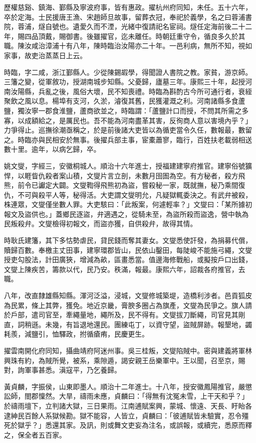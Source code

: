 \begin{pinyinscope}
歷權慈谿、鎮海、鄞縣及寧波府事，皆有惠政。擢杭州府同知，未任。五十六年，卒於定海。士民援唐王漁、宋趙師旦故事，留葬衣冠，奉祀於義學，名之曰蓉浦書院，蓉浦，燧自號也。遺愛久而不湮，光緒中復請祀名宦祠。燧任定海前後二十二年，賜四品頂戴，賜御書。後雖擢官，迄未離任。時朝廷重守令，循良多久於其職。陳汝咸治漳浦十有八年，陳時臨治汝陽亦二十年。一邑利病，無所不知，視如家事，故吏治蒸蒸日上云。

時臨，字二咸，浙江鄞縣人。少從陳錫嘏學，得聞證人書院之教。家貧，游京師。三籓之變，從軍敘功，授湖南城步知縣。父憂歸，廬墓三年。康熙三十年，起授河南汝陽縣，兵亂之後，風俗大壞，民不知喪禮。時臨為斟酌古今所可通行者，衰絰聚飲之風以息。楊埠有支河，久淤，濬復其舊，民獲灌溉之利。河南諸縣多食蘆鹽，獨汝寧一郡食淮鹽，蘆商欲並之，時臨謂：「蘆鹽計口而授，不問其所需之多寡，以成額給之，是厲民也。吾不能為河南盡革其害，反徇商人意以害境內乎？」力爭得止。巡撫徐潮亟稱之，於是前後諸大吏皆以為循吏當令久任，數報最，數留之。時臨亦與民相安於無事。後擢兵部主事，宦橐蕭寥，臨行，百姓扶老載弱相送數十里。逾年，以病乞歸，卒。

姚文燮，字經三，安徽桐城人。順治十六年進士，授福建建寧府推官。建寧俗號獷悍，以睚眥仇殺者案山積，文燮片言立剖，未數月囹圄為空。有方秘者，殺方飛熊，前令已讞定大闢。文燮鞫得飛熊初為盜，嘗殺秘一家，既就撫，秘乃乘間復仇，不可與殺平人等，秘得活。大吏謂文燮明允，凡疑獄輒委決之。有武弁被殺，株連眾，文燮僅坐數人罪。大吏駭曰：「此叛案，何遽輕率？」文燮曰：「某所據初報文及盜供也。」蓋鄉民逐盜，弁適遇之，從騎未至，為盜所殺而盜逸，營中執為民叛殺弁。文燮檢得初報文，而盜亦獲，自供殺弁，故得其情。

時耿氏建籓，其下多怙勢虐民，貸民錢而奪其妻女。文燮悉使訐發，為捐募代償，贖歸百數。奉檄主丈田事，建寧環郡皆山，民依山鑿田，每陡峻不能施弓繩，文燮授吏勾股法，計田廣狹，增減為畝，區畫悉當。值邊海修戰船，或擬按戶口出錢，文燮上陳疾苦，籌款以代，民乃安。秩滿，報最。康熙六年，詔裁各府推官，去職。

八年，改直隸雄縣知縣。渾河泛溢，浸城，文燮修城築堤，造橋利涉者。邑貢狐皮為民累，條上其弊，獲免。地近京畿，膏腴多圈占為旗產，文燮為民爭之。旗人請於戶部，遣司官至，牽繩量地，繩所及，民不得有。文燮拔刀斷繩，司官見其剛直，詞稍遜。未幾，有旨退地還民。團練屯丁，以資守望，盜賊屏跡。報墾地，蠲耗羨，減鹽引，恤驛政，拊循瘡痏，民慶更生。

擢雲南開化府同知，攝曲靖府阿迷州事。吳三桂叛，文燮陷賊中。密與建義將軍林興珠有約，為賊所覺，被系，乘隙遁，謁安親王岳樂軍中。王以聞，召至京，賜對，詢軍事甚悉。滇寇平，乃乞養歸。

黃貞麟，字振侯，山東即墨人。順治十二年進士。十八年，授安徽鳳陽推官，嚴懲訟師，閤郡懍然。大旱，禱雨未應，貞麟曰：「得無有沈冤未雪，上干天和乎？」於禱雨壇下，立判諸大獄，三日果雨。江南逋賦案興，蒙城、懷遠、天長、盱眙各逮紳民百餘人系獄候勘。獄不能容，人皆立，貞麟曰：「彼逋賦皆未驗實，忍令殭死於獄乎？」悉還其家。及訊，則或舞文吏妄為注名，或誤報，或續完，悉原而釋之，保全者五百家。


\end{pinyinscope}
